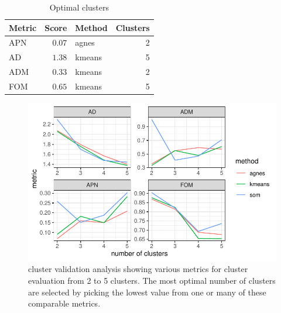 \documentclass[
  authoryear,
  preprint,
  3p]{elsarticle}
\begin{document}
\hypertarget{tbl-opticlust}{}
\begin{longtable}{lrlr}
\caption{\label{tbl-opticlust}Optimal clusters }\tabularnewline

\toprule
Metric & Score & Method & Clusters \\ 
\midrule
APN & $0.07$ & agnes & 2 \\ 
AD & $1.38$ & kmeans & 5 \\ 
ADM & $0.33$ & kmeans & 2 \\ 
FOM & $0.65$ & kmeans & 5 \\ 
\bottomrule
\end{longtable}

\begin{figure}

{\centering \includegraphics{paper_files/figure-pdf/fig-clvalid-1.pdf}

}

\caption{\label{fig-clvalid}cluster validation analysis showing various
metrics for cluster evaluation from 2 to 5 clusters. The most optimal
number of clusters are selected by picking the lowest value from one or
many of these comparable metrics.}

\end{figure}
\end{document}
